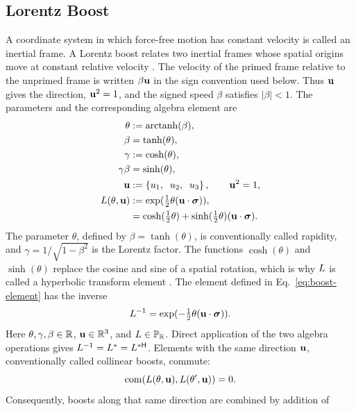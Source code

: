 \subsection{Lorentz Boost}
A coordinate system in which force-free motion has constant velocity is
called an inertial frame. A Lorentz boost relates two inertial frames whose
spatial origins move at constant relative velocity
\cite{lorentz1904,einstein1905,minkowski1908}. The velocity of the primed
frame relative to the unprimed frame is written
\(\beta\mathbf{u}\) in the sign convention used below. Thus \(\mathbf{u}\) gives
the direction, \(\mathbf{u}^{2}=1\), and the signed speed \(\beta\) satisfies
\(|\beta|<1\). The parameters and the corresponding algebra element are
\begin{align*}
\theta &:= \operatorname{arctanh}(\beta ),\notag \\
\beta &= \tanh(\theta ),\notag \\
\gamma &:= \cosh(\theta ),\notag \\
\gamma \beta &= \sinh(\theta ),\notag \\
\mathbf{u} &:= \left\{u_{1},\mkern10mu u_{2},\mkern10mu u_{3}\right\},
\qquad \mathbf{u}^{2} = 1,\notag \\
L(\theta ,\mathbf{u}) &:= \exp( \tfrac{1}{2} \theta (\mathbf{u} \cdot \mathbf{\bm{\sigma}} ) ),\notag \\
&= \cosh( \tfrac{1}{2} \theta ) + \sinh( \tfrac{1}{2} \theta ) (\mathbf{u} \cdot \mathbf{\bm{\sigma}} ).
\end{align*}
The parameter \(\theta\), defined by
\(\beta=\tanh(\theta)\), is conventionally called rapidity, and
\(\gamma=1/\sqrt{1-\beta^{2}}\) is the Lorentz factor. The functions
\(\cosh(\theta)\) and \(\sinh(\theta)\) replace the cosine and sine of a
spatial rotation, which is why \(L\) is called a hyperbolic transform
element \cite{baylis1999,doran2003}. The element defined in
Eq.\ \eqref{eq:boost-element} has the
inverse
\begin{equation*}
L^{-1} = \exp( -\tfrac{1}{2} \theta (\mathbf{u} \cdot \mathbf{\bm{\sigma}} ) ).
\end{equation*}
Here \(\theta,\gamma,\beta\in\mathbb{R}\), \(\mathbf{u}\in\mathbb{R}^3\), and
\(L\in\mathbb{P}_{\mathbb{R}}\). Direct application of the two algebra operations
gives
\(L^{-1}=L^{*}=L^{*\mathsf H}\). Elements with the same
direction \(\mathbf{u}\), conventionally called collinear boosts, commute:
\begin{equation*}
\operatorname{com}\!\left(L(\theta ,\mathbf{u}),L(\theta ',\mathbf{u})\right)=0.
\end{equation*}
Consequently, boosts along that same direction are combined by addition of
